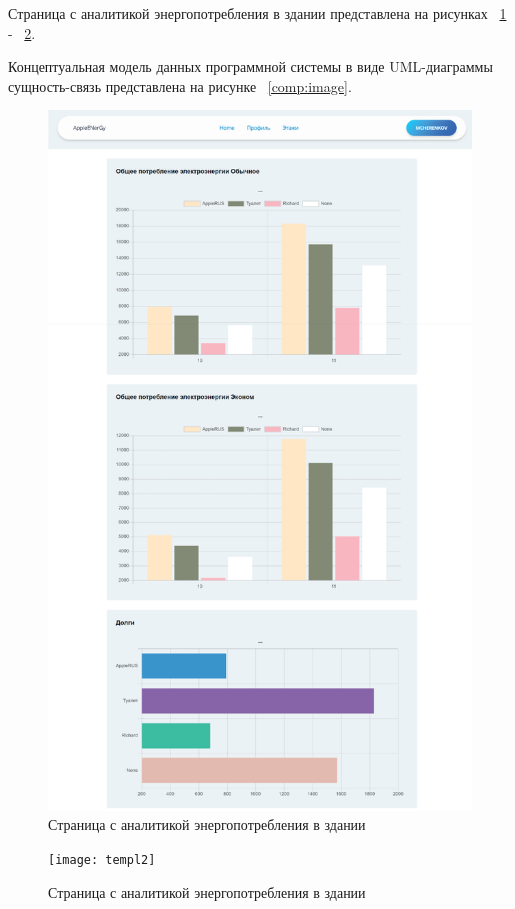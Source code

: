 Страница с аналитикой энергопотребления в здании представлена на рисунках ~\ref{templ1:image} - ~\ref{templ2:image}.

 
Концептуальная модель данных программной системы в виде UML-диаграммы сущность-связь представлена на рисунке ~\ref{comp:image}.

\begin{figure}[ht]
\center\includegraphics[width=0.65\linewidth]{templ1}
\caption{Страница с аналитикой энергопотребления в здании}
\label{templ1:image}
\end{figure}

\newpage %

\begin{figure}[ht]
	\center\texttt{[image: templ2]}
	\caption{Страница с аналитикой энергопотребления в здании}
	\label{templ2:image}
\end{figure}

\newpage %

